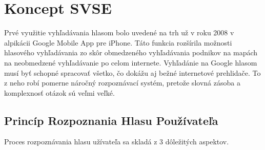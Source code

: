 \documentclass[10pt,slovak,a4paper]{article}
\begin{document}
\section{Koncept SVSE} \label{ina}
Prvé využitie vyhľadávania hlasom bolo uvedené na trh už v roku 2008 v alpikácii Google Mobile App pre iPhone. Táto funkcia rozšírila možnosti hlasového vyhľadávania zo skôr obmedzeného vyhľadávania podnikov na mapách na neobmedzené vyhľadávanie po celom internete. Vyhľadánie na Google hlasom musí byť schopné spracovať všetko, čo dokážu aj bežné internetové prehlidače. To z neho robí pomerne náročný rozpoznávací systém, pretože slovná zásoba a komplexnosť otázok sú veľmi veľké. 
\cite{schalkwyk2010your}

\subsection{Princíp Rozpoznania Hlasu Používateľa} 
Proces rozpoznávania hlasu užívateľa sa skladá z 3 dôležitých aspektov.
\end{document}
